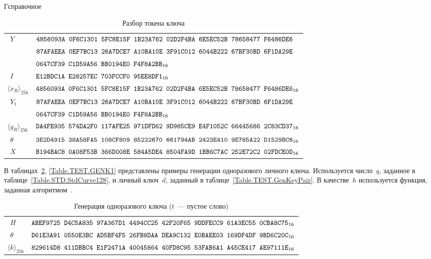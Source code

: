 \begin{appendix}{Г}{справочное}
\begin{table}[!h]
\caption{Разбор токена ключа}\label{Table.TEST.TokenUnwrap}
{\small
\begin{tabular}{|l|l|}
%
\hline
$\phantom{\langle}Y$ & 
$\texttt{4856093A~0F6C1301~5FC8E15F~1B23A762~02D2F4BA~6E5EC52B~78658477~F6486DE6}$\\
&
$\texttt{87AFAEEA~0EF7BC13~26A7DCE7~A10BA10E~3F91C012~6044B222~67BF30BD~6F1DA29E}$\\
&
$\texttt{0647CF39~C1D59A56~BB0194E0~F4F8A2BB}_{16}$\\
%
\hline
$\phantom{\langle}I$ & 
$\texttt{E12BDC1A~E28257EC~703FCCF0~95EE8DF1}_{16}$\\
%
\dhline
$\langle x_R\rangle_{256}$ & 
$\texttt{4856093A~0F6C1301~5FC8E15F~1B23A762~02D2F4BA~6E5EC52B~78658477~F6486DE6}_{16}$\\
%
\hline
$\phantom{\langle}Y_1$ & 
$\texttt{87AFAEEA~0EF7BC13~26A7DCE7~A10BA10E~3F91C012~6044B222~67BF30BD~6F1DA29E}$\\
&
$\texttt{0647CF39~C1D59A56~BB0194E0~F4F8A2BB}_{16}$\\
%
\hline
$\langle y_R\rangle_{256}$ & 
$\texttt{DA4FE935~574DA2F0~117AFE25~971DFD62~9D985CE9~E4F1052C~66445686~2C83CD37}_{16}$\\
%
\hline
$\phantom{\langle}\theta$ & 
$\texttt{3E2D4915~38A58FA5~108CF809~85222670~661794AB~2423E410~9E785A22~D1529BC6}_{16}$\\
\dhline
$\phantom{\langle}X$ & 
$\texttt{B194BAC8~0A08F53B~366D008E~584A5DE4~8504FA9D~1BB6C7AC~252E72C2~02FDCE0D}_{16}$\\
\hline
\end{tabular}
}
\end{table}

\label{TEST.GENK}

В таблицах~\ref{Table.TEST.GENK}, \ref{Table.TEST.GENK1} 
представлены примеры генерации одноразового личного ключа.
%
Используется число~$q$, заданное в таблице~\ref{Table.STD.StdCurve128},
и личный ключ~$d$, заданный в таблице~\ref{Table.TEST.GenKeyPair}.
%
%
В качестве~$h$ используется функция,
заданная алгоритмом~.

\begin{table}[!h]
\caption{Генерация одноразового ключа ($t$~--- пустое слово)}
\label{Table.TEST.GENK}
{\small
\begin{tabular}{|l|l|}
%
\hline
$\phantom{\langle}H$ & 
$\texttt{ABEF9725~D4C5A835~97A367D1~4494CC25~42F20F65~9DDFECC9~61A3EC55~0CBA8C75}_{16}$\\
%
\dhline
$\phantom{\langle}\theta$ & 
$\texttt{D61E3A91~0550E3BC~AD5BF4F5~26FB8DAA~DEA9C132~E0BAEE03~169DF4DF~9BD6C20C}_{16}$\\
%
\dhline
$\langle k\rangle_{256}$ & 
%
$\texttt{829614D8~411DBBC4~E1F2471A~40045864~40FD8C95~53FAB6A1~A45CE417~AE97111E}_{16}$\\
\hline
\end{tabular}
}
\end{table}


\end{appendix}
